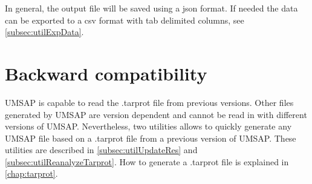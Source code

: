 In general, the output file will be saved using a json format. If needed the data can be exported to a csv format with tab delimited columns, see \autoref{subsec:utilExpData}. 

\section{Backward compatibility}
\label{sec:backwardCompatibility}

UMSAP is capable to read the .tarprot file from previous versions. Other files generated by UMSAP are version dependent and cannot be read in with different versions of UMSAP. Nevertheless, two utilities allows to quickly generate any UMSAP file based on a .tarprot file from a previous version of UMSAP. These utilities are described in \autoref{subsec:utilUpdateRes} and \autoref{subsec:utilReanalyzeTarprot}. How to generate a .tarprot file is explained in \autoref{chap:tarprot}.
